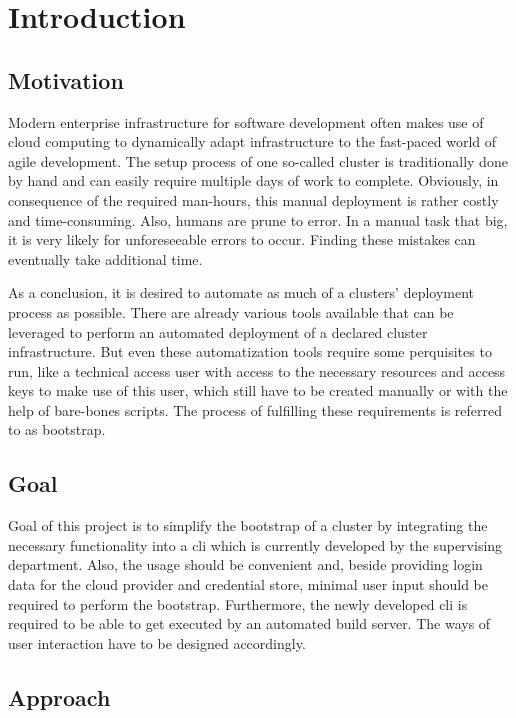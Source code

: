 \chapter{Introduction}
\section{Motivation}
Modern enterprise infrastructure for software development often makes use of cloud computing to dynamically adapt infrastructure to the fast-paced world of agile development.
The setup process of one so-called cluster is traditionally done by hand and can easily require multiple days of work to complete.
Obviously, in consequence of the required man-hours, this manual deployment is rather costly and time-consuming.
Also, humans are prune to error.
In a manual task that big, it is very likely for unforeseeable errors to occur.
Finding these mistakes can eventually take additional time.

As a conclusion, it is desired to automate as much of a clusters' deployment process as possible.
There are already various tools available that can be leveraged to perform an automated deployment of a declared cluster infrastructure.
But even these automatization tools require some perquisites to run, like a technical access user with access to the necessary resources and access keys to make use of this user, which still have to be created manually or with the help of bare-bones scripts.
The process of fulfilling these requirements is referred to as bootstrap.

\section{Goal}
Goal of this project is to simplify the bootstrap of a cluster by integrating the necessary functionality into a \ac{cli} which is currently developed by the supervising department.
Also, the usage should be convenient and, beside providing login data for the cloud provider and credential store, minimal user input should be required to perform the bootstrap.
Furthermore, the newly developed \ac{cli} is required to be able to get executed by an automated build server.
The ways of user interaction have to be designed accordingly.

\section{Approach}

